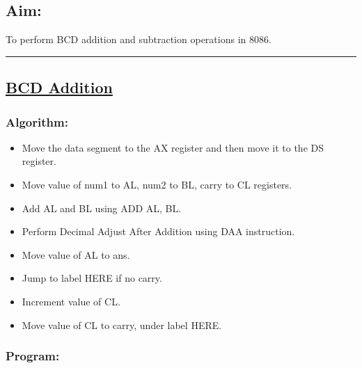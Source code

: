 \documentclass[10pt,a4paper]{article}
\begin{document}
\begin{flushleft}
\subsection*{\textbf{Aim:}} 
To perform BCD addition and subtraction operations in 8086.

\vspace{1cm}
\hrule
\subsection*{\textbf{\underline{BCD Addition}}}

\subsubsection*{\textbf{Algorithm:}}
\begin{itemize}
    \item Move the data segment to the AX register and then move it to the DS register.
    \item Move value of num1 to AL, num2 to BL, carry to CL registers.
    \item Add AL and BL using ADD AL, BL.
    \item Perform Decimal Adjust After Addition using DAA instruction.
    \item Move value of AL to ans.
    \item Jump to label HERE if no carry.
    \item Increment value of CL.
    \item Move value of CL to carry, under label HERE.
\end{itemize}

\newpage
\subsubsection*{\textbf{Program:}}


\end{flushleft}
\end{document}
